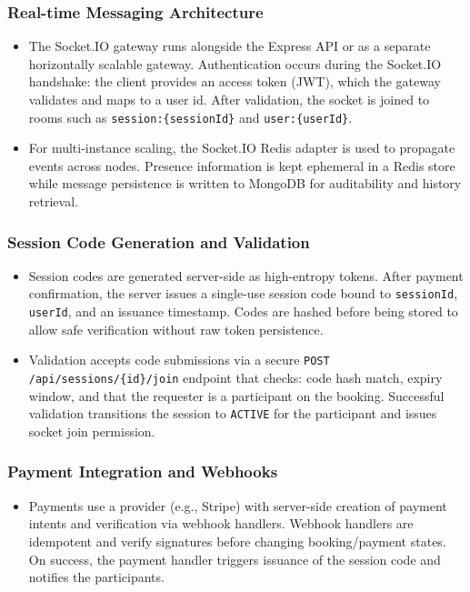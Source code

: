 \documentclass[a4paper,12pt]{report}
\begin{document}
\subsubsection{Real-time Messaging Architecture}
\begin{itemize}[leftmargin=*]
  \item[--] The Socket.IO gateway runs alongside the Express API or as a separate horizontally scalable gateway. Authentication occurs during the Socket.IO handshake: the client provides an access token (JWT), which the gateway validates and maps to a user id. After validation, the socket is joined to rooms such as \texttt{session:\{sessionId\}} and \texttt{user:\{userId\}}.
  \item[--] For multi-instance scaling, the Socket.IO Redis adapter is used to propagate events across nodes. Presence information is kept ephemeral in a Redis store while message persistence is written to MongoDB for auditability and history retrieval.
\end{itemize}

\subsubsection{Session Code Generation and Validation}
\begin{itemize}[leftmargin=*]
  \item[--] Session codes are generated server-side as high-entropy tokens. After payment confirmation, the server issues a single-use session code bound to \texttt{sessionId}, \texttt{userId}, and an issuance timestamp. Codes are hashed before being stored to allow safe verification without raw token persistence.
  \item[--] Validation accepts code submissions via a secure \texttt{POST /api/sessions/\{id\}/join} endpoint that checks: code hash match, expiry window, and that the requester is a participant on the booking. Successful validation transitions the session to \texttt{ACTIVE} for the participant and issues socket join permission.
\end{itemize}

\subsubsection{Payment Integration and Webhooks}
\begin{itemize}[leftmargin=*]
  \item[--] Payments use a provider (e.g., Stripe) with server-side creation of payment intents and verification via webhook handlers. Webhook handlers are idempotent and verify signatures before changing booking/payment states. On success, the payment handler triggers issuance of the session code and notifies the participants.
\end{itemize}
\end{document}
